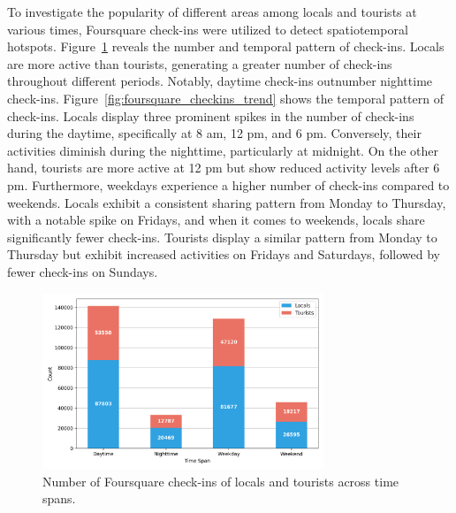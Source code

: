 \documentclass{article}
\theoremstyle{definition}
\theoremstyle{remark}
\begin{document}
To investigate the popularity of different areas among locals and tourists at various times, Foursquare check-ins were utilized to detect spatiotemporal hotspots. Figure~\ref{fig:foursquare_checkins_count} reveals the number and temporal pattern of check-ins. Locals are more active than tourists, generating a greater number of check-ins throughout different periods. Notably, daytime check-ins outnumber nighttime check-ins. Figure~\ref{fig:foursquare_checkins_trend} shows the temporal pattern of check-ins. Locals display three prominent spikes in the number of check-ins during the daytime, specifically at 8 am, 12 pm, and 6 pm. Conversely, their activities diminish during the nighttime, particularly at midnight. On the other hand, tourists are more active at 12 pm but show reduced activity levels after 6 pm. Furthermore, weekdays experience a higher number of check-ins compared to weekends. Locals exhibit a consistent sharing pattern from Monday to Thursday, with a notable spike on Fridays, and when it comes to weekends, locals share significantly fewer check-ins. Tourists display a similar pattern from Monday to Thursday but exhibit increased activities on Fridays and Saturdays, followed by fewer check-ins on Sundays.


\begin{figure}[!h]
\centering
\includegraphics[width=0.75\textwidth]{figures/foursquare_checkins_count.png}
\caption{\label{fig:foursquare_checkins_count}Number of Foursquare check-ins of locals and tourists across time spans.}
\end{figure}
\end{document}
